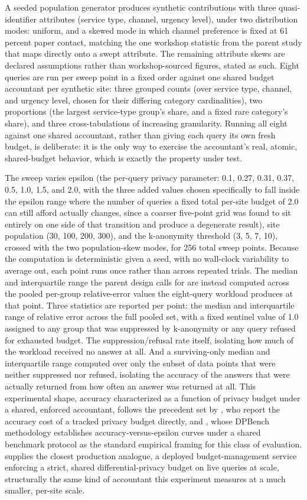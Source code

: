 A seeded population generator produces synthetic contributions with three quasi-identifier attributes (service type, channel, urgency level), under two distribution modes: uniform, and a skewed mode in which channel preference is fixed at 61 percent paper contact, matching the one workshop statistic from the parent study that maps directly onto a swept attribute. The remaining attribute skews are declared assumptions rather than workshop-sourced figures, stated as such. Eight queries are run per sweep point in a fixed order against one shared budget accountant per synthetic site: three grouped counts (over service type, channel, and urgency level, chosen for their differing category cardinalities), two proportions (the largest service-type group's share, and a fixed rare category's share), and three cross-tabulations of increasing granularity. Running all eight against one shared accountant, rather than giving each query its own fresh budget, is deliberate: it is the only way to exercise the accountant's real, atomic, shared-budget behavior, which is exactly the property under test.

The sweep varies epsilon (the per-query privacy parameter: 0.1, 0.27, 0.31, 0.37, 0.5, 1.0, 1.5, and 2.0, with the three added values chosen specifically to fall inside the epsilon range where the number of queries a fixed total per-site budget of 2.0 can still afford actually changes, since a coarser five-point grid was found to sit entirely on one side of that transition and produce a degenerate result), site population (30, 100, 200, 300), and the k-anonymity threshold (3, 5, 7, 10), crossed with the two population-skew modes, for 256 total sweep points. Because the computation is deterministic given a seed, with no wall-clock variability to average out, each point runs once rather than across repeated trials. The median and interquartile range the parent design calls for are instead computed across the pooled per-group relative-error values the eight-query workload produces at that point. Three statistics are reported per point: the median and interquartile range of relative error across the full pooled set, with a fixed sentinel value of 1.0 assigned to any group that was suppressed by k-anonymity or any query refused for exhausted budget. The suppression/refusal rate itself, isolating how much of the workload received no answer at all. And a surviving-only median and interquartile range computed over only the subset of data points that were neither suppressed nor refused, isolating the accuracy of the answers that were actually returned from how often an answer was returned at all. This experimental shape, accuracy characterized as a function of privacy budget under a shared, enforced accountant, follows the precedent set by \cite{abadi2016}, who report the accuracy cost of a tracked privacy budget directly, and \cite{hay2016}, whose DPBench methodology establishes accuracy-versus-epsilon curves under a shared benchmark protocol as the standard empirical framing for this class of evaluation. \cite{rogers2021} supplies the closest production analogue, a deployed budget-management service enforcing a strict, shared differential-privacy budget on live queries at scale, structurally the same kind of accountant this experiment measures at a much smaller, per-site scale.

